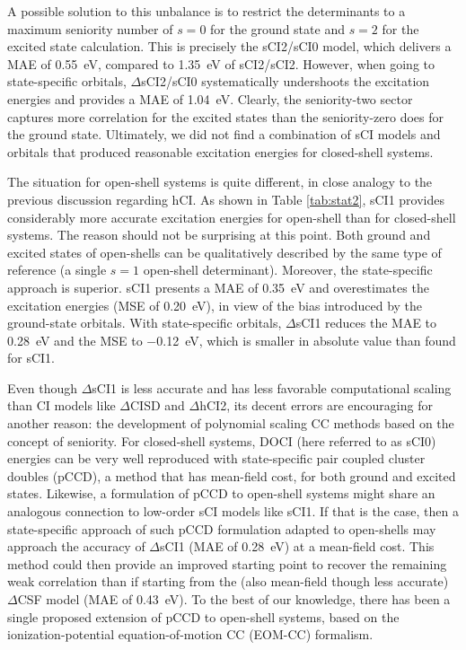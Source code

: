 \documentclass[aip,jcp,reprint,noshowkeys,superscriptaddress]{revtex4-1}
\begin{document}
A possible solution to this unbalance is to restrict the determinants to a maximum seniority number of $s=0$ for the ground state and $s=2$ for the excited state calculation.
This is precisely the sCI2/sCI0 model, which delivers a MAE of \SI{0.55}{\eV}, compared to \SI{1.35}{\eV} of sCI2/sCI2.
However, when going to state-specific orbitals, $\Delta$sCI2/sCI0 systematically undershoots the excitation energies and provides a MAE of \SI{1.04}{\eV}.
Clearly, the seniority-two sector captures more correlation for the excited states than the seniority-zero does for the ground state.
Ultimately, we did not find a combination of sCI models and orbitals that produced reasonable excitation energies for closed-shell systems.

The situation for open-shell systems is quite different, in close analogy to the previous discussion regarding hCI.
As shown in Table \ref{tab:stat2}, sCI1 provides considerably more accurate excitation energies for open-shell than for closed-shell systems.
The reason should not be surprising at this point.
Both ground and excited states of open-shells can be qualitatively described by the same type of reference (a single $s=1$ open-shell determinant).
Moreover, the state-specific approach is superior.
sCI1 presents a MAE of \SI{0.35}{\eV} and overestimates the excitation energies (MSE of \SI{+0.20}{\eV}), in view of the bias introduced by the ground-state orbitals.
With state-specific orbitals, $\Delta$sCI1 reduces the MAE to \SI{0.28}{\eV} and the MSE to \SI{-0.12}{\eV}, which is smaller in absolute value than found for sCI1.

Even though $\Delta$sCI1 is less accurate and has less favorable computational scaling than CI models like $\Delta$CISD and $\Delta$hCI2,
its decent errors are encouraging for another reason:
the development of polynomial scaling CC methods based on the concept of seniority.
For closed-shell systems, DOCI (here referred to as sCI0) energies can be very well reproduced with state-specific pair coupled cluster doubles (pCCD), a method that has mean-field cost,
for both ground \cite{Bytautas_2011,Allen_1962,Smith_1965,Veillard_1967} and excited \cite{Kossoski_2021,Marie_2021} states.
Likewise, a formulation of pCCD to open-shell systems might share an analogous connection to low-order sCI models like sCI1.
If that is the case, then a state-specific approach of such pCCD formulation adapted to open-shells may approach the accuracy of $\Delta$sCI1 (MAE of \SI{0.28}{\eV}) at a mean-field cost.
This method could then provide an improved starting point to recover the remaining weak correlation than if starting from the (also mean-field though less accurate) $\Delta$CSF model (MAE of \SI{0.43}{\eV}).
To the best of our knowledge, there has been a single proposed extension of pCCD to open-shell systems, \cite{Boguslawski_2021}
based on the ionization-potential equation-of-motion CC (EOM-CC) formalism. \cite{Stanton_1994,Muneaki_2006,Bomble_2005}
\end{document}
